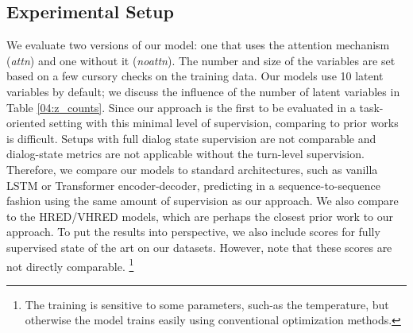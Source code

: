 \subsection{Experimental Setup}
\label{sec:expe_setup}
We evaluate two versions of our model: one that uses the attention mechanism (\emph{attn}) and one without it (\emph{noattn}). The number and size of the variables are set based on a few cursory checks on the training data. Our models use 10 latent variables by default; we discuss the influence of the number of latent variables in Table \ref{04:z_counts}.
Since our approach is the first to be evaluated in a task-oriented setting with this minimal level of supervision, comparing to prior works is difficult. Setups with full dialog state supervision are not comparable and dialog-state metrics are not applicable without the turn-level supervision. Therefore, we compare our models to standard architectures, such as vanilla LSTM or Transformer encoder-decoder, predicting in a sequence-to-sequence fashion using the same amount of supervision as our approach. We also compare to the HRED/VHRED models, which are perhaps the closest prior work to our approach. To put the results into perspective, we also include scores for fully supervised state of the art on our datasets.
However, note that these scores are not directly comparable.
\footnote{The training is sensitive to some parameters, such-as the  temperature, but otherwise the model trains easily using conventional optimization methods.}

